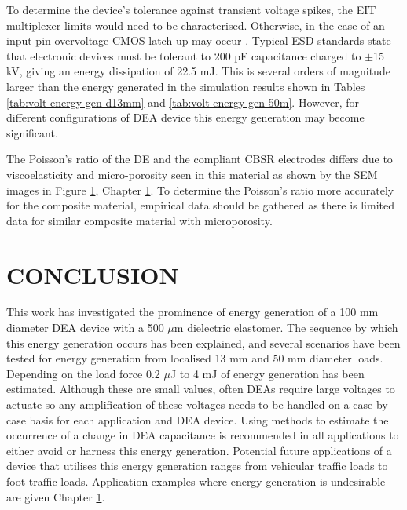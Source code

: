 To determine the device's tolerance against transient voltage spikes, the EIT multiplexer limits would need to be characterised. Otherwise, in the case of an input pin overvoltage CMOS latch-up may occur \cite{Redmond2001} . Typical ESD standards \cite{IEC2008} state that electronic devices must be tolerant to 200 pF capacitance charged to $\pm$15 kV, giving an energy dissipation of 22.5 mJ. This is several orders of magnitude larger than the energy generated in the simulation results shown in Tables \ref{tab:volt-energy-gen-d13mm} and \ref{tab:volt-energy-gen-50m}. However, for different configurations of DEA device this energy generation may become significant.

The Poisson's ratio of the DE and the compliant CBSR electrodes differs due to viscoelasticity and micro-porosity seen in this material as shown by the SEM images in Figure \ref{}, Chapter \ref{}. To determine the Poisson's ratio more accurately for the composite material, empirical data should be gathered as there is limited data for similar composite material with microporosity.  %


\section{CONCLUSION}

This work has investigated the prominence of energy generation of a 100 mm diameter DEA device with a 500 $\mu$m dielectric elastomer. The sequence by which this energy generation occurs has been explained, and several scenarios have been tested for energy generation from localised 13 mm and 50 mm diameter loads. Depending on the load force 0.2 $\mu$J to 4 mJ of energy generation has been estimated. Although these are small values, often DEAs require large voltages to actuate so any amplification of these voltages needs to be handled on a case by case basis for each application and DEA device. Using methods to estimate the occurrence of a change in DEA capacitance is recommended in all applications to either avoid or harness this energy generation. Potential future applications of a device that utilises this energy generation ranges from vehicular traffic loads to foot traffic loads. Application examples where energy generation is undesirable are given Chapter \ref{}.   
